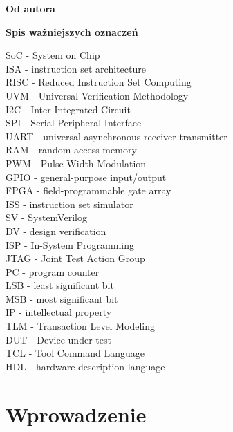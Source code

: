 \documentclass[11pt,a4paper]{article}
\begin{document}
\begin{center}
\textbf {\Large Od autora}
\\
\vspace{0.5cm}

\newpage

\large\tableofcontents 

\newpage
\listoffigures


\newpage

\textbf {\Large Spis ważniejszych oznaczeń}
\begin{flushleft}
SoC - System on Chip
\\ISA - instruction set architecture
\\RISC - Reduced Instruction Set Computing
\\UVM - Universal Verification Methodology
\\I2C - Inter-Integrated Circuit
\\SPI - Serial Peripheral Interface
\\UART - universal asynchronous receiver-transmitter
\\RAM - random-access memory
\\PWM - Pulse-Width Modulation
\\GPIO - general-purpose input/output
\\FPGA - field-programmable gate array
\\ISS - instruction set simulator
\\SV - SystemVerilog
\\DV - design verification
\\ISP - In-System Programming
\\JTAG - Joint Test Action Group
\\PC - program counter
\\LSB - least significant bit
\\MSB - most significant bit
\\IP - intellectual property
\\TLM - Transaction Level Modeling
\\DUT - Device under test
\\TCL - Tool Command Language
\\HDL - hardware description language
\end{flushleft}
\vspace{0.5cm}
\end{center}

\newpage
\section{Wprowadzenie} 
\end{document}
